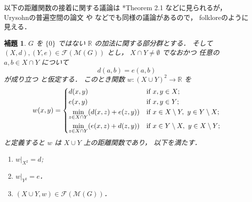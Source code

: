 \documentclass[leqno, 12pt]{jsarticle}
\newtheorem{lem}[thm]{補題}
\newcommand{\rr}{\mathbb{R}}
\newcommand{\Met}[1]{\mathscr{M}(#1)}
\newcommand{\FinitePart}[1]{\mathscr{F}(#1)}
\newcommand{\FinMet}[1]{\FinitePart{\Met{#1}}}
\newcommand{\restr}[2]{#1|_{#2}}
\begin{document}
以下の距離関数の接着に関する議論は
\cite{Bo2002}*{Theorem 2.1}
などに見られるが，
Urysohnの普遍空間の論文
 \cite{Ury1}
 や
  \cite{Ury2}などでも同様の議論があるので，
folkloreのように見える．
\begin{lem}\label{lem:amal:pushout1}
$G$
を
$\{0\}$
ではない
$\rr$
の加法に関する部分群とする．
そして
$(X, d), (Y, e)\in \FinMet{G}$
とし，
$X\cap Y\neq \emptyset$
でなおかつ
任意の
$a, b\in X\cap Y$%
について
\[
d(a, b)=e(a, b)
\]
が成り立つ
と仮定する．
このとき関数
$w\colon  (X\cup Y)^2\to \rr$
を
\begin{align*}
	w(x, y)=
		\begin{dcases}
		d(x, y) & \text{if
$x, y\in X$;}\\
		e(x, y) & \text{if
$x, y\in Y$;}\\
		\min_{z\in X\cap Y}(d(x, z)+e(z, y)) & \text{if
$x\in X\setminus Y,\ y\in Y\setminus X$;}\\
		\min_{z\in X\cap Y}(e(x, z)+d(z, y)) & \text{if
$x\in Y\setminus X,\ y\in X\setminus Y$;}
		\end{dcases}
\end{align*}
と定義すると
$w$
は
$X\cup Y$
上の距離関数であり，%
以下を満たす．
\begin{enumerate}[label=\textup{(\arabic*)}]
\item
$\restr{w}{X^2}=d$;
	\item
	$\restr{w}{Y^2}=e$．


	\item
	$(X\cup Y, w)\in \FinMet{G}$．
\end{enumerate}




\end{lem}
\end{document}
